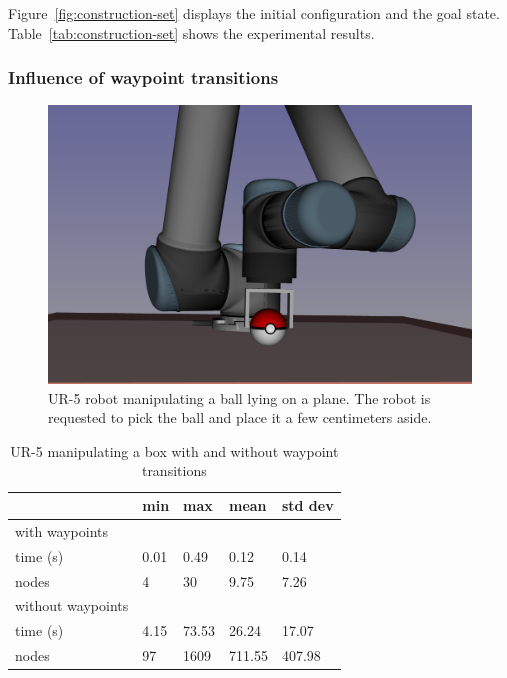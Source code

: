 Figure~\ref{fig:construction-set} displays the initial configuration and the
goal state. Table~\ref{tab:construction-set} shows the experimental results.

\subsubsection{Influence of waypoint transitions}

\begin{figure}
  \begin{center}
    \includegraphics[width=\linewidth]{figures/ur5-grasps-pokeball.png}
  \end{center}
  \caption{UR-5 robot manipulating a ball lying on a plane. The robot is requested to pick the ball and place it a few centimeters aside.}
  \label{fig:ur5-pokeball}
\end{figure}

\begin{table}
  \begin{center}
  \begin{tabular}{|l|l|l|l|l|}
    \hline
    & min & max & mean & std dev \\
    \hline
    with waypoints&&&&\\
    time (s) & 0.01 & 0.49 & 0.12 & 0.14 \\
    nodes & 4 &  30 & 9.75 & 7.26\\
    \hline
    without waypoints&&&&\\
    time (s) & 4.15 & 73.53 & 26.24 & 17.07 \\
    nodes & 97 &  1609 & 711.55 & 407.98\\
    \hline
  \end{tabular}
  \end{center}
  \caption{UR-5 manipulating a box with and without waypoint transitions}
  \label{tab:waypoint}
\end{table}

